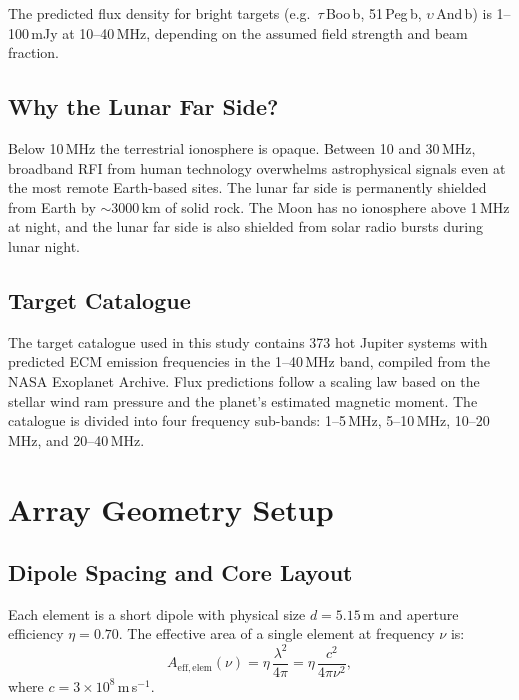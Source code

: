 \documentclass[12pt,a4paper]{article}
\begin{document}
The predicted flux density for bright targets (e.g.\ $\tau$\,Boo\,b,
51\,Peg\,b, $\upsilon$\,And\,b) is 1--100\,mJy at 10--40\,MHz, depending on
the assumed field strength and beam fraction.

\subsection{Why the Lunar Far Side?}

Below 10\,MHz the terrestrial ionosphere is opaque.
Between 10 and 30\,MHz, broadband RFI from human technology overwhelms
astrophysical signals even at the most remote Earth-based sites.
The lunar far side is permanently shielded from Earth by $\sim$3000\,km of
solid rock.
The Moon has no ionosphere above 1\,MHz at night, and the lunar far side
is also shielded from solar radio bursts during lunar night.

\subsection{Target Catalogue}

The target catalogue used in this study contains 373 hot Jupiter systems with
predicted ECM emission frequencies in the 1--40\,MHz band, compiled from the
NASA Exoplanet Archive.
Flux predictions follow a scaling law based on the stellar wind ram pressure
and the planet's estimated magnetic moment.
The catalogue is divided into four frequency sub-bands:
1--5\,MHz, 5--10\,MHz, 10--20\,MHz, and 20--40\,MHz.

\section{Array Geometry Setup}
\label{sec:geometry}

\subsection{Dipole Spacing and Core Layout}

Each element is a short dipole with physical size $d = 5.15$\,m and aperture
efficiency $\eta = 0.70$.
The effective area of a single element at frequency $\nu$ is:
\begin{equation}
  A_\mathrm{eff,elem}(\nu) = \eta\,\frac{\lambda^2}{4\pi}
  = \eta\,\frac{c^2}{4\pi\nu^2},
  \label{eq:aeff_elem}
\end{equation}
where $c = 3 \times 10^8$\,m\,s$^{-1}$.
\end{document}
